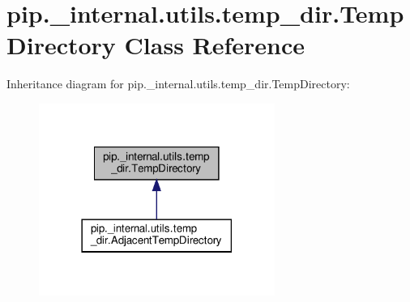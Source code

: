 \hypertarget{classpip_1_1__internal_1_1utils_1_1temp__dir_1_1TempDirectory}{}\section{pip.\+\_\+internal.\+utils.\+temp\+\_\+dir.\+Temp\+Directory Class Reference}
\label{classpip_1_1__internal_1_1utils_1_1temp__dir_1_1TempDirectory}


Inheritance diagram for pip.\+\_\+internal.\+utils.\+temp\+\_\+dir.\+Temp\+Directory\+:
\nopagebreak
\begin{figure}[H]
\begin{center}
\leavevmode
\includegraphics[width=218pt]{classpip_1_1__internal_1_1utils_1_1temp__dir_1_1TempDirectory__inherit__graph}
\end{center}
\end{figure}

